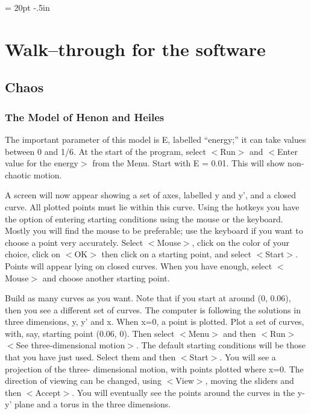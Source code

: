 \parindent = 20pt
\parskip=10pt
\pagestyle{myheadings}
\textwidth=6in
\textheight=8.5in
\hoffset -.5in
\setlength{\topmargin}{-.3in}
\raggedbottom
{}  


\appendix


\chapter{Walk--through for the software}



\section{Chaos}




\subsection{The Model of Henon and Heiles}

   The important parameter of this model is E, labelled ``energy;'' it can
take values between 0 and 1/6. At the start of the program, select
$<$Run$>$ and $<$Enter value for the energy$>$ from the Menu. Start with E =
0.01. This will show non-chaotic motion.

   A screen will now appear showing a set of axes, labelled y and y', and
a closed curve. All plotted points must lie within this curve. Using the
hotkeys you have the option of entering starting conditions using the mouse
or the keyboard. Mostly you will find the mouse to be preferable; use the
keyboard if you want to choose a point very accurately. Select $<$Mouse$>$,
click on the color of your choice, click on $<$OK$>$ then click on a starting
point, and select $<$Start$>$. Points will appear lying on closed curves. When
you have enough, select $<$Mouse$>$ and choose another starting point.

   Build as many curves as you want. Note that if you start at around
(0, 0.06), then you see a different set of curves.
The computer is following the solutions in three dimensions, y, y' and x.
When x=0, a point is plotted. Plot a set of curves, with, say, starting
point (0.06, 0). Then select $<$Menu$>$ and then $<$Run$>$ $<$See
three-dimensional motion$>$. The default starting conditions will be those that
you have just used. Select them and then $<$Start$>$. You will see a projection
of the three- dimensional motion, with points plotted where x=0. The direction
of viewing can be changed, using $<$View$>$, moving the sliders and then
$<$Accept$>$. You will eventually see the points around the curves in the y-y'
plane and a torus in the three dimensions.

